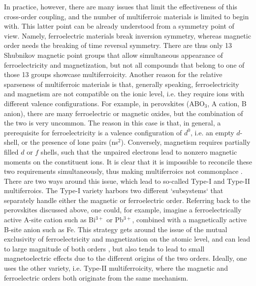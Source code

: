 In practice, however, there are many issues that limit the effectiveness of this cross-order coupling, and the number of multiferroic materials is limited to begin with.
This latter point can be already understood from a symmetry point of view.
Namely, ferroelectric materials break inversion symmetry, whereas magnetic order needs the breaking of time reversal symmetry.
There are thus only 13 Shubnikov magnetic point groups that allow simultaneous appearance of ferroelectricity and magnetization\cite{Wang2009}, but not all compounds that belong to one of those 13 groups showcase multiferroicity.
Another reason for the relative sparseness of multiferroic materials is that, generally speaking, ferroelectricity and magnetism are not compatible on the ionic level, i.e. they require ions with different valence configurations.
For example, in perovskites (ABO$_3$, A cation, B anion), there are many ferroelectric or magnetic oxides, but the combination of the two is very uncommon.
The reason in this case is that, in general, a prerequisite for ferroelectricity is a valence configuration of $d^0$, i.e. an empty $d$-shell, or the presence of lone pairs (ns$^2$).
Conversely, magnetism requires partially filled $d$ or $f$ shells, such that the unpaired electrons lead to nonzero magnetic moments on the constituent ions.
It is clear that it is impossible to reconcile these two requirements simultaneously, thus making multiferroics not commonplace .
There are two ways around this issue, which lead to so-called Type-I and Type-II multiferroics\cite{Khomskii2009}.
The Type-I variety harbors two different `subsystems` that separately handle either the magnetic or ferroelectric order.
Referring back to the perovskites discussed above, one could, for example, imagine a ferroelectrically active A-site cation such as Bi$^{3+}$ or Pb$^{3+}$, combined with a magnetically active B-site anion such as Fe\cite{Wang2009}.
This strategy gets around the issue of the mutual exclusivity of ferroelectricity and magnetization on the atomic level, and can lead to large magnitude of both orders , but also tends to lead to small magnetoelectric effects due to the different origins of the two orders. 
Ideally, one uses the other variety, i.e. Type-II multiferroicity, where the magnetic and ferroelectric orders both originate from the same mechanism.
